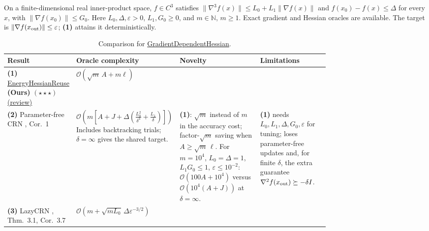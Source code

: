 \begin{table}[tp]
\centering
\caption{Comparison for \href{https://github.com/k3nfalt/longtails/blob/main/LongTails/Setups/GradientDependentHessian.lean}{GradientDependentHessian}.}\label{tab:GradientDependentHessian}
\parbox{\linewidth}{\footnotesize On a finite-dimensional real inner-product space, $f\in C^3$ satisfies $\|\nabla^3 f(x)\|\le L_0+L_1\|\nabla f(x)\|$ and $f(x_0)-f(x)\le\Delta$ for every $x$, with $\|\nabla f(x_0)\|\le G_0$. Here $L_0,\Delta,\varepsilon>0$, $L_1,G_0\ge0$, and $m\in\mathbb N$, $m\ge1$. Exact gradient and Hessian oracles are available. The target is $\|\nabla f(x_{\rm out})\|\le\varepsilon$; \textbf{(1)} attains it deterministically.}\par\smallskip
\begin{threeparttable}
\footnotesize
\setlength{\tabcolsep}{4pt}\renewcommand{\arraystretch}{1.25}
\begin{tabularx}{\linewidth}{@{}>{\raggedright\arraybackslash}p{0.20\linewidth}>{\raggedright\arraybackslash}p{0.31\linewidth}>{\raggedright\arraybackslash}p{0.25\linewidth}>{\raggedright\arraybackslash}X@{}}
\toprule
\textbf{Result} & \textbf{Oracle complexity} & \textbf{Novelty} & \textbf{Limitations} \\
\midrule
\textbf{(1)} \href{https://github.com/k3nfalt/longtails/blob/main/LongTails/Theorems/EnergyHessianReuse.lean}{Energy\allowbreak Hessian\allowbreak Reuse} \textbf{(Ours)} $(\star\star\star)$ \href{https://github.com/k3nfalt/longtails/blob/main/scripts/reviews/EnergyHessianReuse.md}{(review)}
& $\mathcal{O}\!\left(\sqrt m\,A+m\ell\right)$ & & \\
\midrule[1.2pt]
\textbf{(2)} Parameter-free CRN \citep{gdhFang2026v1}, Cor.~1
& $\mathcal{O}\!\left(m\left[A+J+\Delta\left(\frac{L_0^2}{\delta^3}+\frac{L_1}{\delta}\right)\right]\right)$\newline
Includes backtracking trials; $\delta=\infty$ gives the shared target.
& \textbf{(1)}: $\sqrt m$ instead of $m$ in the accuracy cost; factor-$\sqrt m$ saving when $A\ge\sqrt m\,\ell$. For $m=10^4$, $L_0=\Delta=1$, $L_1G_0\le1$, $\varepsilon\le10^{-2}$: $\mathcal{O}(100A+10^4)$ versus $\mathcal{O}(10^4(A+J))$ at $\delta=\infty$.
& \textbf{(1)} needs $L_0,L_1,\Delta,G_0,\varepsilon$ for tuning; loses parameter-free updates and, for finite $\delta$, the extra guarantee $\nabla^2f(x_{\rm out})\succeq-\delta I$. \\
\midrule
\textbf{(3)} LazyCRN \citep{gdhDoikov2023}, Thm.~3.1, Cor.~3.7
& $\mathcal{O}\!\left(m+\sqrt{mL_0}\,\Delta\varepsilon^{-3/2}\right)$\newline

\end{tabularx}
\end{threeparttable}
\end{table}
